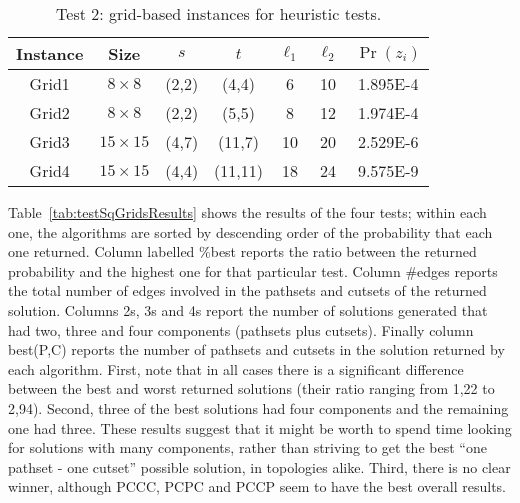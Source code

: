 \documentclass[a4paper]{article}
\newcommand{\ele}{{\ell}}
\begin{document}
\begin{table}
\begin{center} \small
\begin{tabular}{ | c | c | c | c | c | c | c | }
\hline
Instance & Size & $s$ & $t$ & $\ele_1$ & $\ele_2$ & $\Pr(z_i)$ \\ \hline \hline
Grid1 & $8\times 8$ & (2,2) & (4,4) & 6 & 10 & 1.895E-4 \\ \hline
Grid2 & $8\times 8$ & (2,2) & (5,5) & 8 & 12 & 1.974E-4 \\ \hline
Grid3 & $15\times 15$ & (4,7) & (11,7) & 10 & 20 & 2.529E-6 \\ \hline
Grid4 & $15\times 15$ & (4,4) & (11,11) & 18 & 24 & 9.575E-9 \\ \hline
\end{tabular}
\end{center}
\caption{Test 2: grid-based instances for heuristic tests.}
\label{tab:testSqGrids}
\end{table}

Table~\ref{tab:testSqGridsResults} shows the results of the four tests; within each one, the algorithms are sorted by descending order of the probability that each one returned. Column labelled \%\/best reports the ratio between the returned probability and the highest one for that particular test. Column \#edges reports the total number of edges involved in the pathsets and cutsets of the returned solution. Columns 2s, 3s and 4s report the number of solutions generated that had two, three and four components (pathsets plus cutsets). Finally column best(P,C) reports the number of pathsets and cutsets in the solution returned by each algorithm. First, note that in all cases there is a significant difference between the best and worst returned solutions (their ratio ranging from 1,22 to 2,94). Second, three of the best solutions had four components and the remaining one had three. These results suggest that it might be worth to spend time looking for solutions with many components, rather than striving to get the best ``one pathset - one cutset'' possible solution, in topologies alike. Third, there is no clear winner, although PCCC, PCPC and PCCP seem to have the best overall results.  
\end{document}
